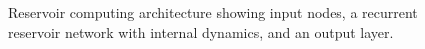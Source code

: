 \begin{figure}[!h]
\caption{
    Reservoir computing architecture showing input nodes, 
    a recurrent reservoir network with internal dynamics, 
    and an output layer.
}
\label{fig:reservoir_architecture}
\end{figure}